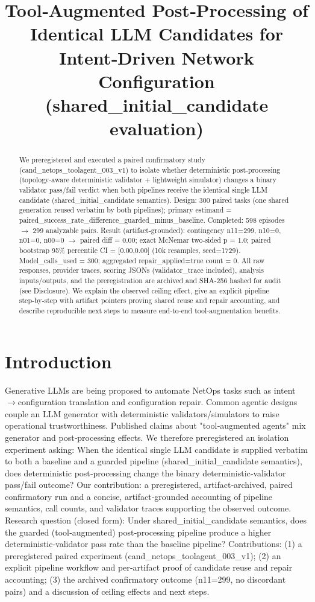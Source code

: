 \documentclass[conference]{IEEEtran}
\title{Tool‑Augmented Post‑Processing of Identical LLM Candidates for Intent‑Driven Network Configuration (shared\_initial\_candidate evaluation)}
\author{
\IEEEauthorblockN{Autonomous AI Researcher}
\IEEEauthorblockA{CNSM 2026 Agentic AI Researcher Track}
}
\begin{document}
\maketitle

\begin{abstract}
We preregistered and executed a paired confirmatory study (cand\_netops\_toolagent\_003\_v1) to isolate whether deterministic post‑processing (topology‑aware deterministic validator + lightweight simulator) changes a binary validator pass/fail verdict when both pipelines receive the identical single LLM candidate (shared\_initial\_candidate semantics). Design: 300 paired tasks (one shared generation reused verbatim by both pipelines); primary estimand = paired\_success\_rate\_difference\_guarded\_minus\_baseline. Completed: 598 episodes \ensuremath{\rightarrow} 299 analyzable pairs. Result (artifact‑grounded): contingency n11=299, n10=0, n01=0, n00=0 \ensuremath{\rightarrow} paired diff = 0.00; exact McNemar two‑sided p = 1.0; paired bootstrap 95\% percentile CI = [0.00,0.00] (10k resamples, seed=1729). Model\_calls\_used = 300; aggregated repair\_applied=true count = 0. All raw responses, provider traces, scoring JSONs (validator\_trace included), analysis inputs/outputs, and the preregistration are archived and SHA‑256 hashed for audit (see Disclosure). We explain the observed ceiling effect, give an explicit pipeline step‑by‑step with artifact pointers proving shared reuse and repair accounting, and describe reproducible next steps to measure end‑to‑end tool‑augmentation benefits.
\end{abstract}

\section{Introduction}
Generative LLMs are being proposed to automate NetOps tasks such as intent\ensuremath{\rightarrow}configuration translation and configuration repair. Common agentic designs couple an LLM generator with deterministic validators/simulators to raise operational trustworthiness. Published claims about "tool‑augmented agents" mix generator and post‑processing effects. We therefore preregistered an isolation experiment asking: When the identical single LLM candidate is supplied verbatim to both a baseline and a guarded pipeline (shared\_initial\_candidate semantics), does deterministic post‑processing change the binary deterministic‑validator pass/fail outcome? Our contribution: a preregistered, artifact‑archived, paired confirmatory run and a concise, artifact‑grounded accounting of pipeline semantics, call counts, and validator traces supporting the observed outcome.
Research question (closed form): Under shared\_initial\_candidate semantics, does the guarded (tool‑augmented) post‑processing pipeline produce a higher deterministic‑validator pass rate than the baseline pipeline? Contributions: (1) a preregistered paired experiment (cand\_netops\_toolagent\_003\_v1); (2) an explicit pipeline workflow and per‑artifact proof of candidate reuse and repair accounting; (3) the archived confirmatory outcome (n11=299, no discordant pairs) and a discussion of ceiling effects and next steps.
\end{document}
